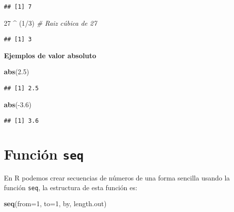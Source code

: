 \documentclass[10pt,]{krantz}
\makeatletter
\newenvironment{Shaded}{\begin{snugshade}}{\end{snugshade}}
\newcommand{\KeywordTok}[1]{\textcolor[rgb]{0.13,0.29,0.53}{\textbf{{#1}}}}
\newcommand{\DataTypeTok}[1]{\textcolor[rgb]{0.13,0.29,0.53}{{#1}}}
\newcommand{\DecValTok}[1]{\textcolor[rgb]{0.00,0.00,0.81}{{#1}}}
\newcommand{\FloatTok}[1]{\textcolor[rgb]{0.00,0.00,0.81}{{#1}}}
\newcommand{\StringTok}[1]{\textcolor[rgb]{0.31,0.60,0.02}{{#1}}}
\newcommand{\CommentTok}[1]{\textcolor[rgb]{0.56,0.35,0.01}{\textit{{#1}}}}
\newcommand{\NormalTok}[1]{{#1}}
\let\proglang=\textsf
\newenvironment{kframe}{%
\medskip{}
\setlength{\fboxsep}{.8em}
 \def\at@end@of@kframe{}%
 \ifinner\ifhmode%
  \def\at@end@of@kframe{\end{minipage}}%
  \begin{minipage}{\columnwidth}%
 \fi\fi%
 \def\FrameCommand##1{\hskip\@totalleftmargin \hskip-\fboxsep
 \colorbox{shadecolor}{##1}\hskip-\fboxsep
     \hskip-\linewidth \hskip-\@totalleftmargin \hskip\columnwidth}%
 \MakeFramed {\advance\hsize-\width
   \@totalleftmargin\z@ \linewidth\hsize
   \@setminipage}}%
 {\par\unskip\endMakeFramed%
 \at@end@of@kframe}
\renewenvironment{Shaded}{\begin{kframe}}{\end{kframe}}
\makeatother
\begin{document}
\begin{verbatim}
## [1] 7
\end{verbatim}

\begin{Shaded}
\begin{Highlighting}[]
\DecValTok{27} \NormalTok{^}\StringTok{ }\NormalTok{(}\DecValTok{1}\NormalTok{/}\DecValTok{3}\NormalTok{)  }\CommentTok{# Raiz cúbica de 27}
\end{Highlighting}
\end{Shaded}

\begin{verbatim}
## [1] 3
\end{verbatim}

\textbf{Ejemplos de valor absoluto}

\begin{Shaded}
\begin{Highlighting}[]
\KeywordTok{abs}\NormalTok{(}\FloatTok{2.5}\NormalTok{)}
\end{Highlighting}
\end{Shaded}

\begin{verbatim}
## [1] 2.5
\end{verbatim}

\begin{Shaded}
\begin{Highlighting}[]
\KeywordTok{abs}\NormalTok{(-}\FloatTok{3.6}\NormalTok{)}
\end{Highlighting}
\end{Shaded}

\begin{verbatim}
## [1] 3.6
\end{verbatim}

\section{\texorpdfstring{Función \texttt{seq} 
}{Función seq  }}\label{funcion-seq}

En \proglang{R} podemos crear secuencias de números de una forma
sencilla usando la función \texttt{seq}, la estructura de esta función
es:

\begin{Shaded}
\begin{Highlighting}[]
\KeywordTok{seq}\NormalTok{(}\DataTypeTok{from=}\DecValTok{1}\NormalTok{, }\DataTypeTok{to=}\DecValTok{1}\NormalTok{, by, length.out)}
\end{Highlighting}
\end{Shaded}
\end{document}
